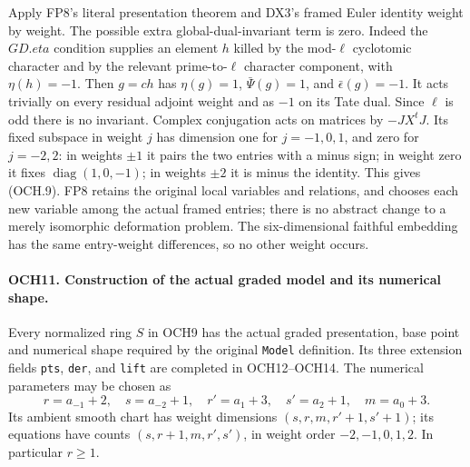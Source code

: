 Apply FP8's literal presentation theorem and DX3's framed Euler
identity weight by weight.  The possible extra global-dual-invariant
term is zero.  Indeed the \(GD.eta\) condition supplies an element
\(h\) killed by the mod-\(\ell\) cyclotomic character and by
the relevant prime-to-\(\ell\) character component, with
\(\eta(h)=-1\).  Then \(g=ch\) has
\(\eta(g)=1\), \(\bar\Psi(g)=1\), and
\(\bar\epsilon(g)=-1\).  It acts trivially on every residual
adjoint weight and as \(-1\) on its Tate dual.  Since \(\ell\)
is odd there is no invariant.  Complex conjugation acts on matrices
by \(-JX^tJ\).  Its fixed subspace in weight \(j\) has
dimension one for \(j=-1,0,1\), and zero for \(j=-2,2\):
in weights \(\pm1\) it pairs the two entries with a minus
sign; in weight zero it fixes \(\operatorname{diag}(1,0,-1)\);
in weights \(\pm2\) it is minus the identity.  This gives
(OCH.9).  FP8 retains the original local variables and relations,
and chooses each new variable among the actual framed entries;
there is no abstract change to a merely isomorphic deformation
problem.  The six-dimensional faithful embedding has the same
entry-weight differences, so no other weight occurs.

\paragraph{OCH11. Construction of the actual graded model and its numerical shape.}
\label{claim:OCH11}
Every normalized ring \(S\) in OCH9 has the actual graded
presentation, base point and numerical shape required by the original
\texttt{Model} definition.  Its three extension fields
\texttt{pts}, \texttt{der}, and \texttt{lift} are completed
in OCH12--OCH14.  The numerical parameters may be chosen as
\[
 r=a_{-1}+2,\quad s=a_{-2}+1,\quad
 r'=a_1+3,\quad s'=a_2+1,\quad m=a_0+3.
 \tag{OCH.10}
\]
Its ambient smooth chart has weight dimensions
\((s,r,m,r'+1,s'+1)\); its equations have counts
\((s,r+1,m,r',s')\), in weight order \(-2,-1,0,1,2\).
In particular \(r\ge1\).

